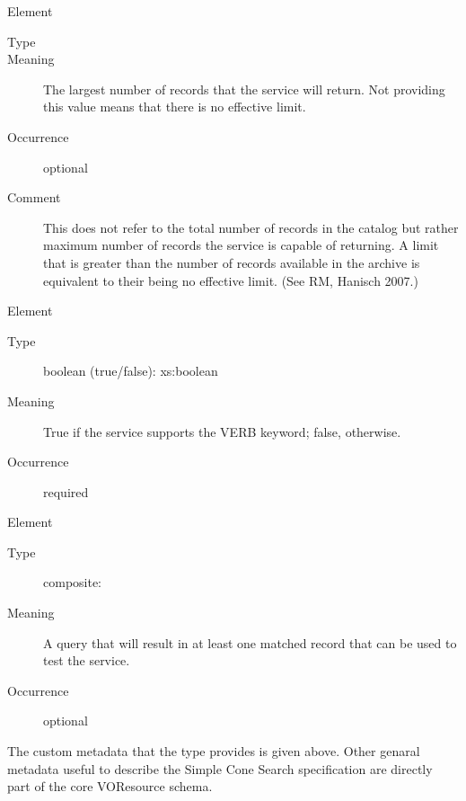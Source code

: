 \documentclass[11pt,a4paper]{ivoa} 
\begin{document}
\begin{generated}
\begin{bigdescription}
\begin{description}
\end{description} \item[Element \xmlel{maxRecords}] \begin{description}
\item[Type]  \item[Meaning] The largest number
of records that the service will return.  Not providing this value means
that there is no effective limit.  
                     
\item[Occurrence] optional \item[Comment] This does not refer to the
total number of records in the catalog but rather maximum number of
records the service is capable of returning.  A limit that is greater
than the number of records available in the archive is equivalent to
their being no effective limit.  (See RM, Hanisch 2007.)
                     

\end{description} \item[Element \xmlel{verbosity}] \begin{description}
\item[Type] boolean (true/false): xs:boolean \item[Meaning] True if the
service supports the VERB keyword; false, otherwise.
                     
\item[Occurrence] required

\end{description} \item[Element \xmlel{testQuery}] \begin{description}
\item[Type] composite:  \item[Meaning] A query that will
result in at least one matched record that can be used to test the
service.  
                     
\item[Occurrence] optional

\end{description}


\end{bigdescription}\endgroup

\endgroup \end{generated}


The custom metadata that the  type provides is
given above. Other genaral metadata useful to describe the Simple Cone
Search specification are directly part of the core VOResource schema.
\end{document}

